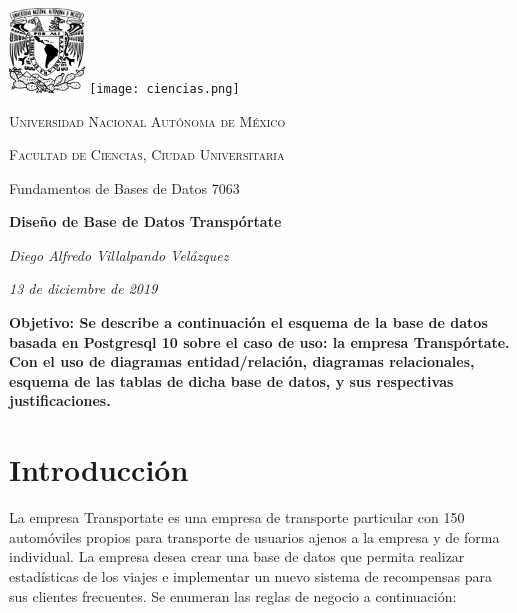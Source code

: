 \documentclass{article}
\begin{document}

{\centering 
\noindent\hrulefill \par \vspace{0.5cm}
\includegraphics[width=2cm]{unam.png} \hspace{11.5cm}
\texttt{[image: ciencias.png]}\vspace{-2.2cm}
     {\scshape\Large Universidad Nacional Autónoma de México \par}
     {\scshape\Large Facultad de Ciencias, Ciudad Universitaria \par}
     {\Large Fundamentos de Bases de Datos 7063\par}
     \vspace{0.2cm}
     {\Large\bfseries Diseño de Base de Datos Transpórtate \par}
     \vspace{0.2cm}
     {\large\itshape Diego Alfredo Villalpando Velázquez \par \vspace{0.2cm}}
     {\large\itshape 13 de diciembre de 2019\par} \vspace{0.35cm}
     \noindent\hrulefill
}

\vspace{0.5cm}
       { \bfseries
         Objetivo:
         Se describe a continuación el esquema de la base de datos basada en Postgresql 10
         sobre el caso de uso: la empresa Transpórtate. Con el uso de diagramas
         entidad/relación, diagramas relacionales, esquema de las tablas de dicha base de
         datos, y sus respectivas justificaciones.
       }
       
       \noindent \tableofcontents
       
       \newpage
       \section{Introducción}
               {
                 La empresa Transportate es una empresa de transporte particular con 150 automóviles
                 propios para transporte de usuarios ajenos a la empresa y de forma individual. La
                 empresa desea crear una base de datos que permita realizar estadísticas
                 de los viajes e implementar un nuevo sistema de recompensas para sus clientes
                 frecuentes. Se enumeran las reglas de negocio a continuación:
               }
               
\end{document}
